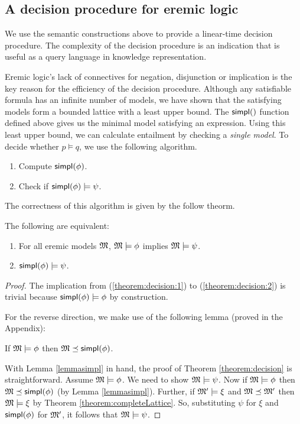 \subsection{A decision procedure for eremic logic}\label{decisionprocedure}

We use the semantic constructions above to provide a linear-time
decision procedure.  The complexity of the decision procedure is an
indication that \ELABR{} is useful as a query language in knowledge
representation.

Eremic logic's lack of connectives for negation, disjunction or
implication is the key reason for the efficiency of the decision
procedure.  Although any satisfiable formula has an infinite number of
models, we have shown that the satisfying models form a bounded
lattice with a least upper bound.  The $\SIMPL$ function defined above
gives us the minimal model satisfying an expression.  Using this least
upper bound, we can calculate entailment by checking a \emph{single
  model}.  To decide whether $p \models q$, we use the following
algorithm.

\begin{enumerate}

\item Compute $\mathsf{simpl}(\phi)$.

\item Check if $\mathsf{simpl}(\phi) \models \psi$.

\end{enumerate}

\NI The correctness of this algorithm is given by the follow theorm.

\begin{theorem}\label{theorem:decision}
  The following are equivalent:
  \begin{enumerate}
    \item\label{theorem:decision:1} For all eremic models $\frak{M}$,
      $\frak{M} \models \phi$ implies $\frak{M} \models \psi$.
    \item\label{theorem:decision:2} $\mathsf{simpl}(\phi) \models \psi$.
  \end{enumerate}
\end{theorem}

\begin{proof}
The implication from  (\ref{theorem:decision:1}) to
(\ref{theorem:decision:2}) is trivial because $\mathsf{simpl}(\phi) \models \phi$ by construction.

For the reverse direction, we make use of the following lemma (proved in the Appendix):
\begin{lemma}
\label{lemmasimpl}
If $\frak{M} \models \phi$ then $\frak{M} \preceq \mathsf{simpl}(\phi)$.
\end{lemma}

With Lemma \ref{lemmasimpl} in hand, the proof of Theorem \ref{theorem:decision} is straightforward.
Assume $\frak{M} \models \phi$. We need to show
$\frak{M} \models \psi$.  Now if $\frak{M} \models \phi$ then $\frak{M} \preceq
\mathsf{simpl}(\phi)$ (by Lemma \ref{lemmasimpl}).  Further, if $\frak{M}' \models \xi $
and $\frak{M} \preceq \frak{M}'$ then $\frak{M} \models \xi $ by Theorem
\ref{theorem:completeLattice}. So, substituting $\psi$ for $\xi $ and
$\mathsf{simpl}(\phi)$ for $\frak{M}'$, it follows that $\frak{M} \models \psi$.
\end{proof}

